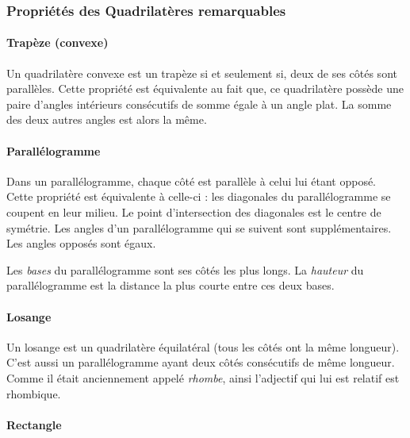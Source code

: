 \documentclass[a4paper, twoside]{article}
\begin{document}
\vspace*{-0.5cm}

\subsubsection{Propriétés des Quadrilatères remarquables}

\paragraph*{Trapèze (convexe)}

Un quadrilatère convexe est un trapèze si et seulement si,
deux de ses côtés sont parallèles.
Cette propriété est équivalente au fait que,
ce quadrilatère possède une paire d'angles intérieurs
consécutifs de somme égale à un angle plat.
La somme des deux autres angles est alors la même.

\vspace*{-0.25cm}

\paragraph*{Parallélogramme}

Dans un parallélogramme, chaque côté est parallèle à celui lui étant opposé.
Cette propriété est équivalente à celle-ci : les diagonales du parallélogramme
se coupent en leur milieu. Le point d'intersection des diagonales est le centre de symétrie.
Les angles d'un parallélogramme qui se suivent sont supplémentaires.
Les angles opposés sont égaux.

Les \emph{bases} du parallélogramme sont ses côtés les plus longs.
La \emph{hauteur} du parallélogramme est la distance la plus courte entre ces deux bases.

\vspace*{-0.25cm}

\paragraph*{Losange}

Un losange est un quadrilatère équilatéral (tous les côtés ont la même longueur).
C'est aussi un parallélogramme ayant deux côtés consécutifs de même longueur.
Comme il était anciennement appelé \textit{rhombe},
ainsi l'adjectif qui lui est relatif est rhombique.

\vspace*{-0.25cm}

\paragraph*{Rectangle}
\end{document}

